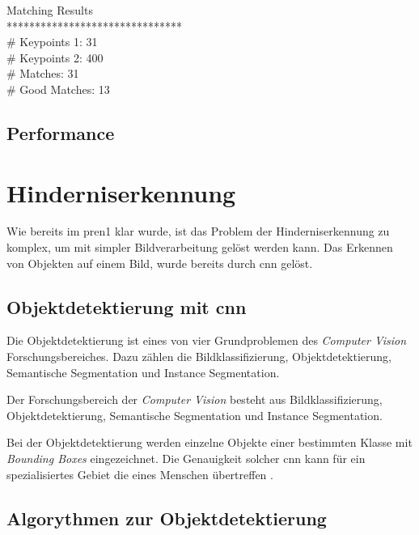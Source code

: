 Matching Results\\
*******************************\\
\# Keypoints 1:                           31\\
\# Keypoints 2:                           400\\
\# Matches:                               31\\
\# Good Matches:                          13\\

\subsection{Performance}




\section{Hinderniserkennung}

Wie bereits im \acrshort{pren1} klar wurde, ist das Problem der Hinderniserkennung zu komplex,
um mit simpler Bildverarbeitung gelöst werden kann. 
Das Erkennen von Objekten auf einem Bild, wurde bereits durch \acrfull{cnn} gelöst.

\subsection{Objektdetektierung mit \acrshort{cnn}}

Die Objektdetektierung ist eines von vier Grundproblemen des {\it Computer Vision} Forschungsbereiches.
Dazu zählen die Bildklassifizierung, Objektdetektierung, Semantische Segmentation und Instance Segmentation.

{
Der Forschungsbereich der {\it Computer Vision} \cite{wu2019recent} besteht aus Bildklassifizierung, 
Objektdetektierung, Semantische Segmentation und Instance Segmentation.
}

Bei der Objektdetektierung werden einzelne Objekte einer bestimmten Klasse mit {\it Bounding Boxes}
eingezeichnet. Die Genauigkeit solcher \acrshort{cnn} kann für ein spezialisiertes Gebiet die
eines Menschen übertreffen \cite{BUETTIDINH2019e00321}.

\subsection{Algorythmen zur Objektdetektierung}

